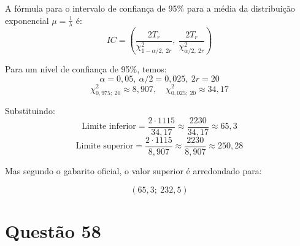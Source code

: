 \documentclass[12pt]{article}
\newcommand{\quest}[1]{\section*{Questão #1}} %
\begin{document}
A fórmula para o intervalo de confiança de 95\% para a média da distribuição exponencial \( \mu = \frac{1}{\lambda} \) é:
\[
IC = \left( \frac{2T_r}{\chi^2_{1 - \alpha/2,\ 2r}},\ \frac{2T_r}{\chi^2_{\alpha/2,\ 2r}} \right)
\]

Para um nível de confiança de 95\%, temos:
\[
\alpha = 0{,}05,\ \alpha/2 = 0{,}025,\ 2r = 20
\]
\[
\chi^2_{0{,}975;\ 20} \approx 8{,}907,\quad \chi^2_{0{,}025;\ 20} \approx 34{,}17
\]

Substituindo:
\[
\text{Limite inferior} = \frac{2 \cdot 1115}{34{,}17} \approx \frac{2230}{34{,}17} \approx 65{,}3
\]
\[
\text{Limite superior} = \frac{2 \cdot 1115}{8{,}907} \approx \frac{2230}{8{,}907} \approx 250{,}28
\]

Mas segundo o gabarito oficial, o valor superior é arredondado para:

\[
\boxed{(65{,}3;\ 232{,}5)}
\]

\quest{58}
\end{document}
